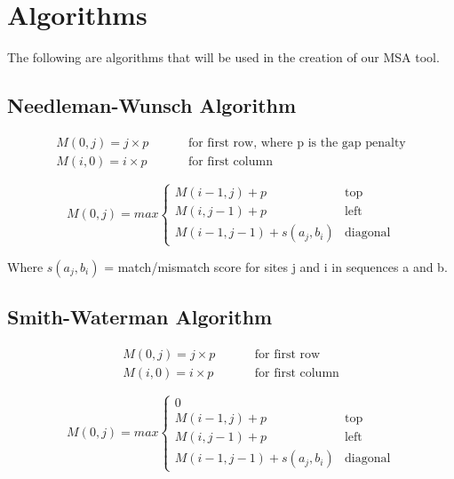 \documentclass{article}
\begin{document}
\newpage
\section*{Algorithms}
The following are algorithms that will be used in the creation of our MSA tool.
\cite{wilke} \cite{fft}

\subsection*{Needleman-Wunsch Algorithm}
\begin{align*}
    M(0, j) = j \times p  \hspace{1cm}&\text{for first row, where p is the gap
    penalty} \\
    M(i, 0) = i \times p  \hspace{1cm}&\text{for first column}
\end{align*}

\begin{equation*}
    M(0, j) = max \begin{cases}
        M(i-1, j) + p & \text{top} \\
        M(i, j-1) + p & \text{left} \\
        M(i-1, j-1) + s(a_j , b_i) & \text{diagonal}
  \end{cases}
\end{equation*}

Where $s(a_j , b_i)$ = match/mismatch score for sites j and i in sequences a and
b. \cite{columbia}

\subsection*{Smith-Waterman Algorithm}
\begin{align*}
    M(0, j) = j \times p  \hspace{1cm}&\text{for first row} \\
    M(i, 0) = i \times p  \hspace{1cm}&\text{for first column}
\end{align*}

\begin{equation*}
    M(0, j) = max \begin{cases}
        0 \\
        M(i-1, j) + p & \text{top} \\
        M(i, j-1) + p & \text{left} \\
        M(i-1, j-1) + s(a_j , b_i) & \text{diagonal}
  \end{cases}
\end{equation*}
\end{document}
